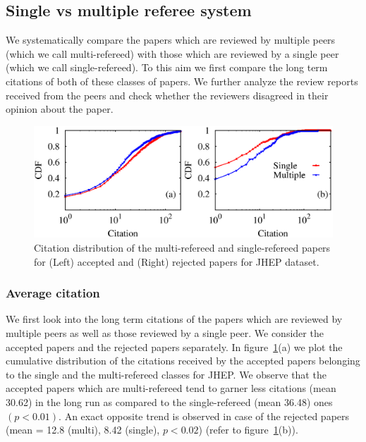 \noindent
\subsection{Single vs multiple referee system}
\label{mvs}
We systematically compare the papers which are reviewed by multiple peers (which we call multi-refereed) with those which are reviewed by a single peer 
(which we call single-refereed). 
To this aim 
we first compare the long term citations of both of these classes of papers. We further analyze the review reports received from the peers and check whether 
the reviewers disagreed in their opinion about the paper. 

\begin{figure}
 \centering
 \includegraphics[scale = 0.35]{./texfiles/Chapter_4/cikm_17/figures/citation_jhep_1.eps}
 \caption{\label{citation:jhep} Citation distribution of the multi-refereed and single-refereed papers for (Left) accepted and (Right) rejected papers for JHEP dataset.} 
 \vspace{3mm}
 \end{figure}


\subsubsection{Average citation}

We first look into the long term citations of the papers which are reviewed by multiple peers as well as those reviewed by a single peer. 
We consider the accepted papers and the rejected papers separately. 
In figure~\ref{citation:jhep}(a) we plot the cumulative distribution of the citations received by the accepted papers belonging to the single and the multi-refereed classes 
for JHEP. 
We observe that the accepted papers which are multi-refereed tend to garner less citations (mean 30.62) in the long run as compared to the single-refereed 
(mean 36.48) ones $(p < 0.01)$. 
An exact opposite trend is observed in case of the rejected papers (mean = 12.8 (multi), 8.42 (single),  $p< 0.02$) (refer to figure~\ref{citation:jhep}(b)). 

